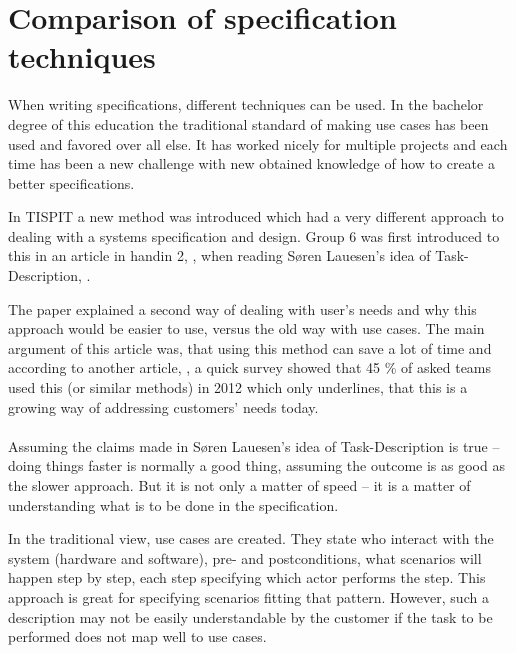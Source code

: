 \documentclass[Main]{subfiles}
\begin{document}
\section{Comparison of specification techniques}


When writing specifications, different techniques can be used.
In the bachelor degree of this education the traditional standard of making use cases has been used and favored over all else.
It has worked nicely for multiple projects and each time has been a new challenge with new obtained knowledge of how to create a better specifications.

In TISPIT a new method was introduced  which had a very different approach to dealing with a systems specification and design.
Group 6 was first introduced to this in an article in handin 2, \parencite[]{HI2}, when reading Søren Lauesen's idea of Task-Description, \parencite[]{Task}.

The paper explained a second way of dealing with user's needs and why this approach would be easier to use, versus the old way with use cases.
The main argument of this article was, that using this method can save a lot of time and according to another article, \parencite[]{Task2}, a quick survey showed that 45 \% of asked teams used this (or similar methods) in 2012 which only underlines, that this is a growing way of addressing customers' needs today.
\\
\\
Assuming the claims made in Søren Lauesen's idea of Task-Description \parencite[]{Task} is true -- doing things faster is normally a good thing, assuming the outcome is as good as the slower approach.
But it is not only a matter of speed -- it is a matter of understanding what is to be done in the specification.

In the traditional view, use cases are created.
They state who interact with the system (hardware and software), pre- and postconditions, what scenarios will happen step by step, each step specifying which actor performs the step.
This approach is great for specifying scenarios fitting that pattern. However, such a description may not be easily understandable by the customer  if the task to be performed does not map well to use cases. 
\end{document}
